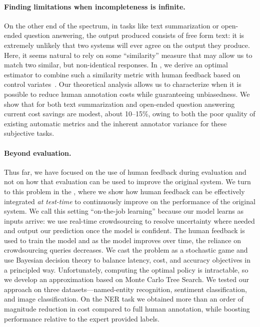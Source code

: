 \paragraph{Finding limitations when incompleteness is infinite.}
On the other end of the spectrum, in tasks like text summarization or open-ended question answering, the output produced consists of free form text: it  is extremely unlikely that two systems will ever agree on the output they produce.
Here, it seems natural to rely on some ``similarity'' measure that may allow us to match two similar, but non-identical responses.
In , we derive an optimal estimator to combine such a similarity metric with human feedback based on control variates~\citep{owen2013monte}.
Our theoretical analysis allows us to characterize when it is possible to reduce human annotation costs while guaranteeing unbiasedness.
We show that for both text summarization and open-ended question answering current cost savings are modest, about 10--15\%, owing to both the poor quality of existing automatic metrics and the inherent annotator variance for these subjective tasks.

\paragraph{Beyond evaluation.}
Thus far, we have focused on the use of human feedback during evaluation and not on how that evaluation can be used to improve the original system.
We turn to this problem in the , where we show how human feedback can be effectively integrated \textit{at test-time} to continuously improve on the performance of the original system.
We call this setting  ``on-the-job learning'' because our model learns as inputs arrive: we use real-time crowdsourcing to resolve uncertainty where needed and output our prediction once the model is confident.
The human feedback is used to train the model and as the model improves over time, the reliance on crowdsourcing queries decreases. 
We cast the problem as a stochastic game and use Bayesian decision theory to balance latency, cost, and accuracy objectives in a principled way. 
Unfortunately, computing the optimal policy is intractable, so we develop an approximation based on Monte Carlo Tree Search.
We tested our approach on three datasets---named-entity recognition, sentiment classification, and image classification.
On the NER task we obtained more than an order of magnitude reduction in cost compared to full human annotation, while boosting performance relative to the expert provided labels.

